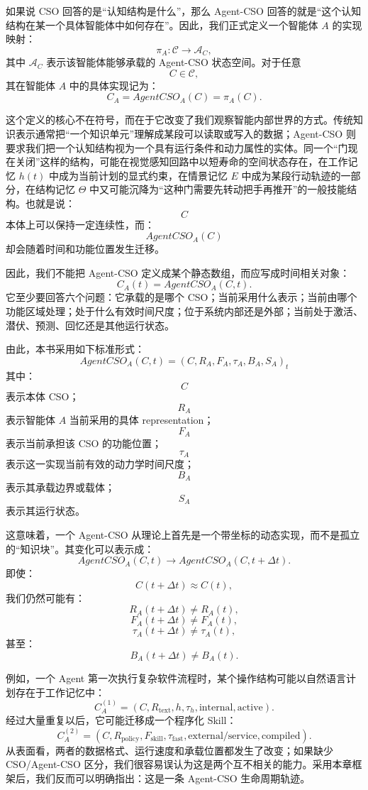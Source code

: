 如果说 CSO 回答的是“认知结构是什么”，那么 Agent-CSO 回答的就是“这个认知结构在某一个具体智能体中如何存在”。因此，我们正式定义一个智能体 $A$ 的实现映射：
\[
\pi_A:
\mathcal C
\rightarrow
\mathcal A_C,
\]
其中 $\mathcal A_C$ 表示该智能体能够承载的 Agent-CSO 状态空间。对于任意
\[
C\in\mathcal C,
\]
其在智能体 $A$ 中的具体实现记为：
\[
\boxed{
C_A
=
AgentCSO_A(C)
=
\pi_A(C).
}
\]

这个定义的核心不在符号，而在于它改变了我们观察智能内部世界的方式。传统知识表示通常把“一个知识单元”理解成某段可以读取或写入的数据；Agent-CSO 则要求我们把一个认知结构视为一个具有运行条件和动力属性的实体。同一个“门现在关闭”这样的结构，可能在视觉感知回路中以短寿命的空间状态存在，在工作记忆 $h(t)$ 中成为当前计划的显式约束，在情景记忆 $E$ 中成为某段行动轨迹的一部分，在结构记忆 $\Theta$ 中又可能沉降为“这种门需要先转动把手再推开”的一般技能结构。也就是说：
\[
C
\]
本体上可以保持一定连续性，而：
\[
AgentCSO_A(C)
\]
却会随着时间和功能位置发生迁移。

因此，我们不能把 Agent-CSO 定义成某个静态数组，而应写成时间相关对象：
\[
C_A(t)
=
AgentCSO_A(C,t).
\]
它至少要回答六个问题：它承载的是哪个 CSO；当前采用什么表示；当前由哪个功能区域处理；处于什么有效时间尺度；位于系统内部还是外部；当前处于激活、潜伏、预测、回忆还是其他运行状态。

由此，本书采用如下标准形式：
\[
\boxed{
AgentCSO_A(C,t)
=
\left(
C,
R_A,
F_A,
\tau_A,
B_A,
S_A
\right)_t
}
\]
其中：
\[
C
\]
表示本体 CSO；
\[
R_A
\]
表示智能体 $A$ 当前采用的具体 representation；
\[
F_A
\]
表示当前承担该 CSO 的功能位置；
\[
\tau_A
\]
表示这一实现当前有效的动力学时间尺度；
\[
B_A
\]
表示其承载边界或载体；
\[
S_A
\]
表示其运行状态。

这意味着，一个 Agent-CSO 从理论上首先是一个带坐标的动态实现，而不是孤立的“知识块”。其变化可以表示成：
\[
AgentCSO_A(C,t)
\rightarrow
AgentCSO_A(C,t+\Delta t).
\]
即使：
\[
C(t+\Delta t)\approx C(t),
\]
我们仍然可能有：
\[
R_A(t+\Delta t)\neq R_A(t),
\]
\[
F_A(t+\Delta t)\neq F_A(t),
\]
\[
\tau_A(t+\Delta t)\neq\tau_A(t),
\]
甚至：
\[
B_A(t+\Delta t)\neq B_A(t).
\]

例如，一个 Agent 第一次执行复杂软件流程时，某个操作结构可能以自然语言计划存在于工作记忆中：
\[
C_A^{(1)}
=
(C,R_{\text{text}},h,\tau_h,\text{internal},\text{active}).
\]
经过大量重复以后，它可能迁移成一个程序化 Skill：
\[
C_A^{(2)}
=
(C,R_{\text{policy}},F_{\text{skill}},\tau_{\text{fast}},
\text{external/service},\text{compiled}).
\]
从表面看，两者的数据格式、运行速度和承载位置都发生了改变；如果缺少 CSO/Agent-CSO 区分，我们很容易误认为这是两个互不相关的能力。采用本章框架后，我们反而可以明确指出：这是一条 Agent-CSO 生命周期轨迹。

